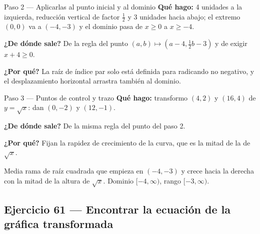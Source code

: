 \documentclass[11pt]{article}
\begin{document}
\begin{paso}{Paso 2 --- Aplicarlas al punto inicial y al dominio}
\textbf{Qué hago:} 4 unidades a la izquierda, reducción vertical de factor $\tfrac12$ y 3 unidades hacia abajo; el extremo $(0,0)$ va a $(-4,-3)$ y el dominio pasa de $x\ge0$ a $x\ge-4$.

\textbf{¿De dónde sale?} De la regla del punto $(a,b)\mapsto(a-4,\tfrac12 b-3)$ y de exigir $x+4\ge0$.

\textbf{¿Por qué?} La raíz de índice par solo está definida para radicando no negativo, y el desplazamiento horizontal arrastra también al dominio.
\end{paso}

\begin{paso}{Paso 3 --- Puntos de control y trazo}
\textbf{Qué hago:} transformo $(4,2)$ y $(16,4)$ de $y=\sqrt x$: dan $(0,-2)$ y $(12,-1)$.

\textbf{¿De dónde sale?} De la misma regla del punto del paso 2.

\textbf{¿Por qué?} Fijan la rapidez de crecimiento de la curva, que es la mitad de la de $\sqrt x$.

\begin{center}
\end{center}
\end{paso}

\begin{resp}
Media rama de raíz cuadrada que empieza en $(-4,-3)$ y crece hacia la derecha con la mitad de la altura de $\sqrt{x}$. Dominio $[-4,\infty)$, rango $[-3,\infty)$.
\end{resp}

\subsection*{Ejercicio 61 — Encontrar la ecuación de la gráfica transformada}
\end{document}
